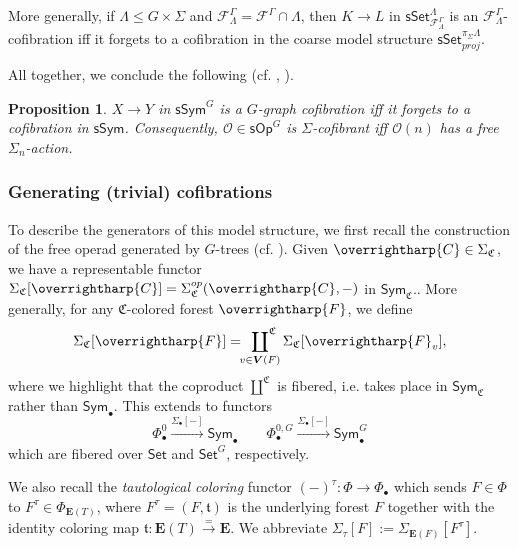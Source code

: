 \documentclass[a4paper,10pt
,draft
]{article}%
\numberwithin{equation}{section}
\numberwithin{figure}{section}
\newtheorem{proposition}[equation]{Proposition}%
\theoremstyle{definition} %
\newcommand{\vect}[1]{\text{\overrightharp{\ensuremath{#1}}}}
\newcommand{\Sym}{\ensuremath{\mathsf{Sym}}}%
\newcommand{\Set}{\ensuremath{\mathsf{Set}}}
\newcommand{\sSet}{\ensuremath{\mathsf{sSet}}}%
\newcommand{\Op}{\mathsf{Op}}%
\newcommand{\sOp}{\ensuremath{\mathsf{sOp}}}%
\newcommand{\F}{\ensuremath{\mathcal F}}
\renewcommand{\O}{\ensuremath{\mathcal O}}
\renewcommand{\P}{\ensuremath{\mathcal P}}
\newcommand{\1}{\ensuremath{\mathbbm 1}}%
\begin{document}
More generally, if $\Lambda \leq G \times \Sigma$ and $\F^\Gamma_{\Lambda} = \F^\Gamma \cap \Lambda$,
then $K \to L$ in $\sSet^{\Lambda}_{\F^\Gamma_\Lambda}$ is an $\F^\Gamma_\Lambda$-cofibration
iff
it forgets to a cofibration in the coarse model structure $\sSet^{\pi_{\Sigma}\Lambda}_{proj}$.
      
All together, we conclude the following (cf. \cite[Remark 6.7]{Per18}, \cite[discussion before Thm. 2.31]{BP_edss}).

\begin{proposition}
      \label{SGS_COF_PROP}
      $X \to Y$ in $\mathsf{sSym}^G$ is a $G$-graph cofibration iff
      it forgets to a cofibration in $\mathsf{sSym}$.
      Consequently, $\O \in \sOp^G$ is $\Sigma$-cofibrant iff $\O(n)$ has a free $\Sigma_n$-action.
\end{proposition}




\subsubsection{Generating (trivial) cofibrations}

To describe the generators of this model structure, we first recall
the construction of the free operad generated by $G$-trees (cf. \cite[\S 2.3.1]{BP_HGOP}). %
Given $\vect C \in \Sigma_{\mathfrak C}$, we have a representable functor $\Sigma_{\mathfrak C}[\vect C] = \Sigma_{\mathfrak C}^{op}(\vect C, -)$ in $\Sym_{\mathfrak C}$..
More generally, for any $\mathfrak C$-colored forest $\vect F$, we define
\[
      \Sigma_{\mathfrak C}[\vect F] = \sideset{}{^{\mathfrak C}}\coprod_{v \in \boldsymbol{V}(F)} \Sigma_{\mathfrak C}[\vect F_v],
\]
where we highlight that the coproduct $\amalg^{\mathfrak C}$ is fibered, i.e. takes place in $\Sym_{\mathfrak C}$ rather than $\Sym_\bullet$.
This extends to functors
\[
      \Phi_\bullet^0 \xrightarrow{\Sigma_\bullet[-]} \Sym_\bullet
      \qquad
      \Phi_\bullet^{0,G} \xrightarrow{\Sigma_\bullet[-]} \Sym_\bullet^G
\]
which are fibered over $\Set$ and $\Set^G$, respectively.

We also recall the \textit{tautological coloring} functor $(-)^\tau \colon \Phi \to \Phi_{\bullet}$
which sends $F \in \Phi$ to $F^\tau \in \Phi_{\boldsymbol{E}(T)}$,
where $F^\tau = (F,\mathfrak t)$ is the underlying forest $F$ together with the identity coloring map $\mathfrak t \colon \boldsymbol{E}(T) \xrightarrow{=} \boldsymbol{E}$.
We abbreviate $\Sigma_\tau[F] := \Sigma_{\boldsymbol{E}(F)}[F^\tau]$.
\end{document}
